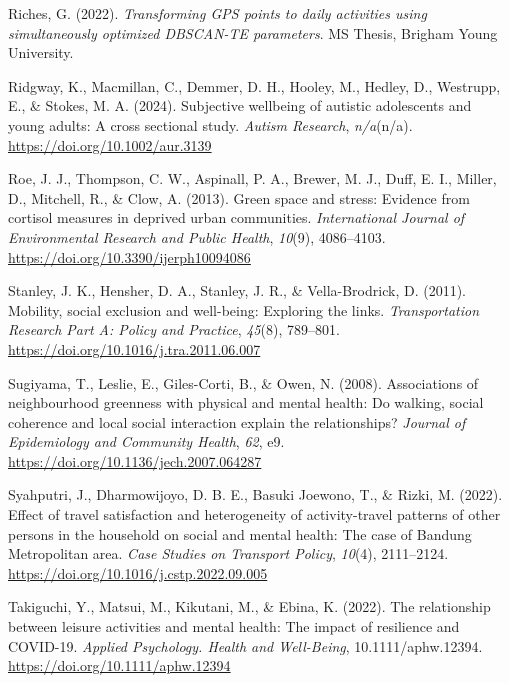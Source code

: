 \documentclass[
  letterpaper,
  number,
  review,
  3p]{elsarticle}
\newlength{\cslhangindent}
\newenvironment{CSLReferences}[2] %
 {\begin{list}{}{%
  \setlength{\itemindent}{0pt}
  \setlength{\leftmargin}{0pt}
  \setlength{\parsep}{0pt}
  \ifodd #1
   \setlength{\leftmargin}{\cslhangindent}
   \setlength{\itemindent}{-1\cslhangindent}
  \fi
  \setlength{\itemsep}{#2\baselineskip}}}
 {\end{list}}
\begin{document}
\begin{CSLReferences}{1}{0}
Riches, G. (2022). \emph{Transforming {GPS} points to daily activities
using simultaneously optimized {DBSCAN-TE} parameters}. MS Thesis,
Brigham Young University.

Ridgway, K., Macmillan, C., Demmer, D. H., Hooley, M., Hedley, D.,
Westrupp, E., \& Stokes, M. A. (2024). Subjective wellbeing of autistic
adolescents and young adults: {A} cross sectional study. \emph{Autism
Research}, \emph{n/a}(n/a). \url{https://doi.org/10.1002/aur.3139}

Roe, J. J., Thompson, C. W., Aspinall, P. A., Brewer, M. J., Duff, E.
I., Miller, D., Mitchell, R., \& Clow, A. (2013). Green space and
stress: {Evidence} from cortisol measures in deprived urban communities.
\emph{International Journal of Environmental Research and Public
Health}, \emph{10}(9), 4086--4103.
\url{https://doi.org/10.3390/ijerph10094086}

Stanley, J. K., Hensher, D. A., Stanley, J. R., \& Vella-Brodrick, D.
(2011). Mobility, social exclusion and well-being: {Exploring} the
links. \emph{Transportation Research Part A: Policy and Practice},
\emph{45}(8), 789--801. \url{https://doi.org/10.1016/j.tra.2011.06.007}

Sugiyama, T., Leslie, E., Giles-Corti, B., \& Owen, N. (2008).
Associations of neighbourhood greenness with physical and mental health:
{Do} walking, social coherence and local social interaction explain the
relationships? \emph{Journal of Epidemiology and Community Health},
\emph{62}, e9. \url{https://doi.org/10.1136/jech.2007.064287}

Syahputri, J., Dharmowijoyo, D. B. E., Basuki Joewono, T., \& Rizki, M.
(2022). Effect of travel satisfaction and heterogeneity of
activity-travel patterns of other persons in the household on social and
mental health: {The} case of {Bandung Metropolitan} area. \emph{Case
Studies on Transport Policy}, \emph{10}(4), 2111--2124.
\url{https://doi.org/10.1016/j.cstp.2022.09.005}

Takiguchi, Y., Matsui, M., Kikutani, M., \& Ebina, K. (2022). The
relationship between leisure activities and mental health: {The} impact
of resilience and {COVID}-19. \emph{Applied Psychology. Health and
Well-Being}, 10.1111/aphw.12394.
\url{https://doi.org/10.1111/aphw.12394}


\end{CSLReferences}
\end{document}
